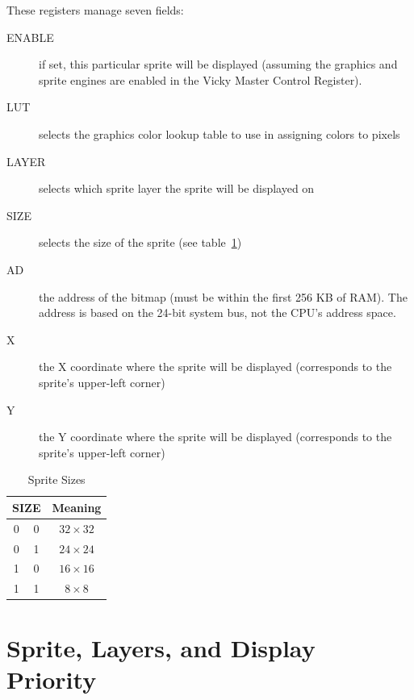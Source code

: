 These registers manage seven fields:

\begin{description}
    \item[ENABLE] if set, this particular sprite will be displayed (assuming the graphics and sprite engines are enabled in the Vicky Master Control Register).

    \item[LUT] selects the graphics color lookup table to use in assigning colors to pixels

    \item[LAYER] selects which sprite layer the sprite will be displayed on

    \item[SIZE] selects the size of the sprite (see table~\ref{tab:sp_sizes})

    \item[AD] the address of the bitmap (must be within the first 256 KB of RAM). The address is based on the 24-bit system bus, not the CPU's address space.

    \item[X] the X coordinate where the sprite will be displayed (corresponds to the sprite's upper-left corner)

    \item[Y] the Y coordinate where the sprite will be displayed (corresponds to the sprite's upper-left corner)
\end{description}

\begin{table}[ht]
    \begin{center}
        \begin{tabular}{|c|c|c|} \hline
            \multicolumn{2}{|c|}{SIZE} & Meaning \\ \hline\hline
            0 & 0 & $32 \times 32$ \\ \hline
            0 & 1 & $24 \times 24$ \\ \hline
            1 & 0 & $16 \times 16$ \\ \hline
            1 & 1 & $8 \times 8$ \\ \hline
        \end{tabular}
    \end{center}
    \caption{Sprite Sizes}
    \label{tab:sp_sizes}
\end{table}

\section*{Sprite, Layers, and Display Priority}

